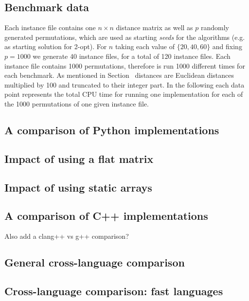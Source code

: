 \documentclass[11pt,a4paper,notitlepage]{article}
\begin{document}
\subsection{Benchmark data}
Each instance file contains one $n \times n$ distance matrix as well
as $p$ randomly generated permutations, which are used as starting
\emph{seeds} for the algorithms (e.g. as starting solution for 2-opt).
For $n$ taking each value of $\{20, 40, 60\}$ and fixing $p = 1000$ we
generate 40 instance files, for a total of 120 instance files. Each
instance file contains 1000 permutations, therefore is run 1000
different times for each benchmark. As mentioned in
Section~\label{sec:benchmark} distances are Euclidean distances multiplied
by 100 and truncated to their integer part. In the following each data
point represents the total CPU time for running one implementation
for each of the 1000 permutations of one given instance file.

\subsection{A comparison of Python implementations}

\subsection{Impact of using a flat matrix}

\subsection{Impact of using static arrays}

\subsection{A comparison of C++ implementations}
Also add a clang++ vs g++ comparison?

\subsection{General cross-language comparison}

\subsection{Cross-language comparison: fast languages}
\end{document}
